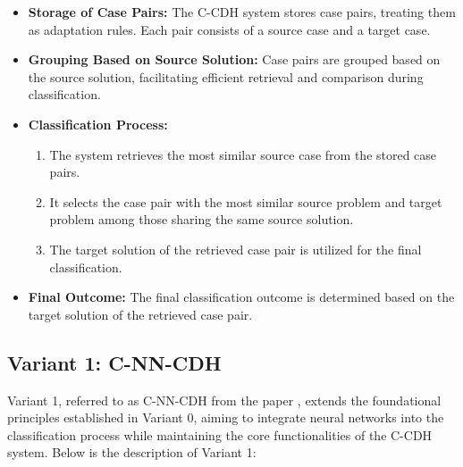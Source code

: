 \documentclass[a4paper, 12pt]{report}
\begin{document}
\begin{itemize}
    \item \textbf{Storage of Case Pairs:} The C-CDH system stores case pairs, treating them as adaptation rules. Each pair consists of a source case and a target case.

    \item \textbf{Grouping Based on Source Solution:} Case pairs are grouped based on the source solution, facilitating efficient retrieval and comparison during classification.

    \item \textbf{Classification Process:}
          \begin{enumerate}
              \item The system retrieves the most similar source case from the stored case pairs.
              \item It selects the case pair with the most similar source problem and target problem among those sharing the same source solution.
              \item The target solution of the retrieved case pair is utilized for the final classification.
          \end{enumerate}

    \item \textbf{Final Outcome:} The final classification outcome is determined based on the target solution of the retrieved case pair.
\end{itemize}

\subsection{Variant 1: C-NN-CDH}

Variant 1, referred to as C-NN-CDH from the paper \cite{ye2021learning}, extends the foundational principles established in Variant 0, 
aiming to integrate neural networks into the classification process while maintaining the core functionalities of the C-CDH system. Below is the description of Variant 1:
\end{document}
